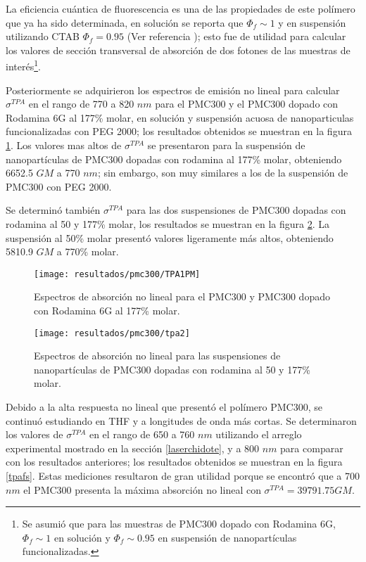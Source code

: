 La eficiencia cu\'antica de fluorescencia es una de las propiedades de este pol\'imero que ya ha sido determinada, en soluci\'on se reporta que $\Phi_f \sim 1$ y en suspensi\'on utilizando CTAB $\Phi_f=0.95$ (Ver referencia \cite{laurita}); esto fue de utilidad para calcular los valores de secci\'on transversal de absorci\'on de dos fotones de las muestras de inter\'es\footnote{Se asumi\'o que para las muestras de PMC300 dopado con Rodamina 6G, $\Phi_f\sim 1$ en soluci\'on y $\Phi_f\sim 0.95$ en suspensi\'on de nanopart\'iculas funcionalizadas.}.

Posteriormente se adquirieron los espectros de emisi\'on no lineal para calcular $\sigma^{TPA}$ en el rango de 770 a 820 $nm$ para el PMC300 y el PMC300 dopado con Rodamina 6G al 177\% molar, en soluci\'on y suspensi\'on acuosa de nanoparticulas funcionalizadas con PEG 2000; los resultados obtenidos se muestran en la figura \ref{tpaita}. Los valores mas altos de $\sigma^{TPA}$ se presentaron para la suspensi\'on de nanopart\'iculas de PMC300 dopadas con rodamina al 177\% molar, obteniendo 6652.5 $GM$ a 770 $nm$; sin embargo, son muy similares a los de la suspensi\'on de PMC300 con PEG 2000.

Se determin\'o tambi\'en $\sigma^{TPA}$ para las dos suspensiones de PMC300 dopadas con rodamina al 50 y 177\% molar, los resultados se muestran en la figura \ref{tpa50}. La suspensi\'on al 50\% molar present\'o valores ligeramente m\'as altos, obteniendo 5810.9 $GM$ a 770\% molar. 

\begin{figure}[H]
\centering
\texttt{[image: resultados/pmc300/TPA1PM]}
\caption{Espectros de absorci\'on no lineal para el PMC300 y PMC300 dopado con Rodamina 6G al 177\% molar.\label{tpaita}}
\end{figure}

\begin{figure}[H]
\centering
\texttt{[image: resultados/pmc300/tpa2]}
\caption{Espectros de absorci\'on no lineal para las suspensiones de nanopart\'iculas de PMC300 dopadas con rodamina al 50 y 177\% molar.\label{tpa50}}
\end{figure}

Debido a la alta respuesta no lineal que present\'o el pol\'imero PMC300, se continu\'o estudiando en THF y a longitudes de onda m\'as cortas. Se determinaron los valores de $\sigma^{TPA}$ en el rango de 650 a 760 $nm$ utilizando el arreglo experimental mostrado en la secci\'on \ref{laserchidote}, y a 800 $nm$ para comparar con los resultados anteriores; los resultados obtenidos se muestran en la figura \ref{tpafs}. Estas mediciones resultaron de gran utilidad porque se encontr\'o que a 700 $nm$ el PMC300 presenta la m\'axima absorci\'on no lineal con $\sigma^{TPA}=39791.75GM$.

